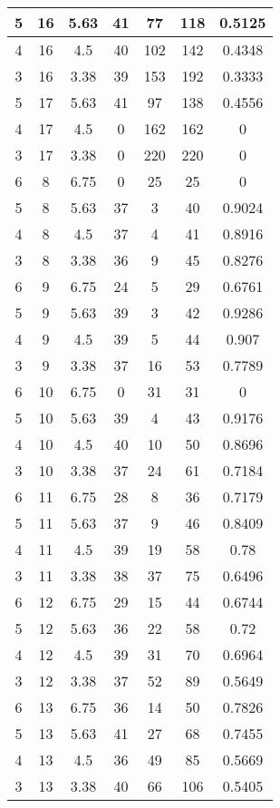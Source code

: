 \documentclass[letterpaper, 12pt]{article}
\begin{document}
\begin{longtable}{|c|c|c|c|c|c|c|}
\hline
5 & 16 & 5.63 & 41 & 77 & 118 & 0.5125 \\
\hline
4 & 16 & 4.5 & 40 & 102 & 142 & 0.4348 \\
\hline
3 & 16 & 3.38 & 39 & 153 & 192 & 0.3333 \\
\hline
5 & 17 & 5.63 & 41 & 97 & 138 & 0.4556 \\
\hline
4 & 17 & 4.5 & 0 & 162 & 162 & 0 \\
\hline
3 & 17 & 3.38 & 0 & 220 & 220 & 0 \\
\hline
6 & 8 & 6.75 & 0 & 25 & 25 & 0 \\
\hline
5 & 8 & 5.63 & 37 & 3 & 40 & 0.9024 \\
\hline
4 & 8 & 4.5 & 37 & 4 & 41 & 0.8916 \\
\hline
3 & 8 & 3.38 & 36 & 9 & 45 & 0.8276 \\
\hline
6 & 9 & 6.75 & 24 & 5 & 29 & 0.6761 \\
\hline
5 & 9 & 5.63 & 39 & 3 & 42 & 0.9286 \\
\hline
4 & 9 & 4.5 & 39 & 5 & 44 & 0.907 \\
\hline
3 & 9 & 3.38 & 37 & 16 & 53 & 0.7789 \\
\hline
6 & 10 & 6.75 & 0 & 31 & 31 & 0 \\
\hline
5 & 10 & 5.63 & 39 & 4 & 43 & 0.9176 \\
\hline
4 & 10 & 4.5 & 40 & 10 & 50 & 0.8696 \\
\hline
3 & 10 & 3.38 & 37 & 24 & 61 & 0.7184 \\
\hline
6 & 11 & 6.75 & 28 & 8 & 36 & 0.7179 \\
\hline
5 & 11 & 5.63 & 37 & 9 & 46 & 0.8409 \\
\hline
4 & 11 & 4.5 & 39 & 19 & 58 & 0.78 \\
\hline
3 & 11 & 3.38 & 38 & 37 & 75 & 0.6496 \\
\hline
6 & 12 & 6.75 & 29 & 15 & 44 & 0.6744 \\
\hline
5 & 12 & 5.63 & 36 & 22 & 58 & 0.72 \\
\hline
4 & 12 & 4.5 & 39 & 31 & 70 & 0.6964 \\
\hline
3 & 12 & 3.38 & 37 & 52 & 89 & 0.5649 \\
\hline
6 & 13 & 6.75 & 36 & 14 & 50 & 0.7826 \\
\hline
5 & 13 & 5.63 & 41 & 27 & 68 & 0.7455 \\
\hline
4 & 13 & 4.5 & 36 & 49 & 85 & 0.5669 \\
\hline
3 & 13 & 3.38 & 40 & 66 & 106 & 0.5405 \\
\hline

\end{longtable}
\end{document}
